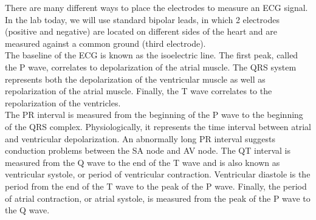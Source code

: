 \documentclass{article}
\begin{document}
There are many different ways to place the electrodes to measure an ECG signal. In the lab today, we will use standard bipolar leads, in which 2 electrodes (positive and negative) are located on different sides of the heart and are measured against a common ground (third electrode).\\

The baseline of the ECG is known as the isoelectric line. The first peak, called the P wave, correlates to depolarization of the atrial muscle. The QRS system represents both the depolarization of the ventricular muscle as well as repolarization of the atrial muscle. Finally, the T wave correlates to the repolarization of the ventricles.\\

The PR interval is measured from the beginning of the P wave to the beginning of the QRS complex. Physiologically, it represents the time interval between atrial and ventricular depolarization. An abnormally long PR interval suggests conduction problems between the SA node and AV node. The QT interval is measured from the Q wave to the end of the T wave and is also known as ventricular systole, or period of ventricular contraction. Ventricular diastole is the period from the end of the T wave to the peak of the P wave. Finally, the period of atrial contraction, or atrial systole, is measured from the peak of the P wave to the Q wave.
\end{document}
